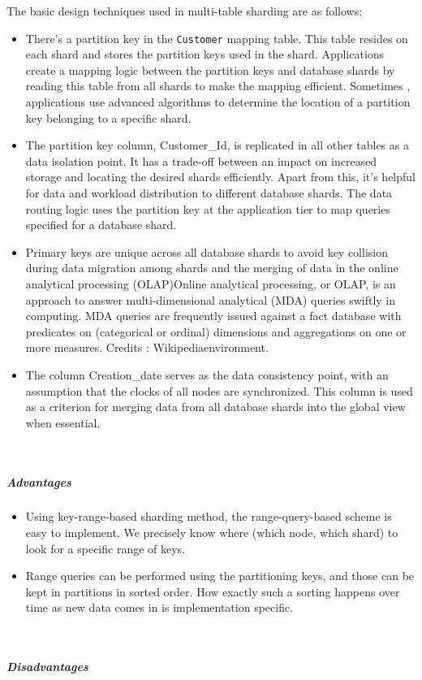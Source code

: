 The basic design techniques used in multi-table sharding are as follows:

\begin{itemize}
\item
\protect{}\label{jJ-Pak1W6uduCabx5hLln}
There's a partition key in the \texttt{Customer} mapping table. This table resides on each shard and stores the partition keys used in the shard. Applications create a mapping logic between the partition keys and database shards by reading this table from all shards to make the mapping efficient. Sometimes , applications use advanced algorithms to determine the location of a partition key belonging to a specific shard.
\item
\protect{}\label{obDuA_s-hvq5SBrbLdS8O}
The partition key column, Customer\_Id, is replicated in all other tables as a data isolation point. It has a trade-off between an impact on increased storage and locating the desired shards efficiently. Apart from this, it's helpful for data and workload distribution to different database shards. The data routing logic uses the partition key at the application tier to map queries specified for a database shard.
\item
\protect{}\label{OD3k92RczIxmwW-cp8LVo}
Primary keys are unique across all database shards to avoid key collision during data migration among shards and the merging of data in the online analytical processing (OLAP)Online analytical processing, or OLAP, is an approach to answer multi-dimensional analytical (MDA) queries swiftly in computing. MDA queries are frequently issued against a fact database with predicates on (categorical or ordinal) dimensions and aggregations on one or more measures. Credits : Wikipediaenvironment.
\item
\protect{}\label{TAIcwI0dNsmbYU-G7i2hU}
The column Creation\_date serves as the data consistency point, with an assumption that the clocks of all nodes are synchronized. This column is used as a criterion for merging data from all database shards into the global view when essential.
\end{itemize}
\\
\subparagraph{Advantages}\label{1T_Q3OcjrfmlV09b3Z14_}

\begin{itemize}
\item
\protect{}\label{1SyAouMHtdvNXvGJNaudC}
Using key-range-based sharding method, the range-query-based scheme is easy to implement. We precisely know where (which node, which shard) to look for a specific range of keys.
\item
\protect{}\label{AKR2jPS7BmrnALnggdpcC}
Range queries can be performed using the partitioning keys, and those can be kept in partitions in sorted order. How exactly such a sorting happens over time as new data comes in is implementation specific.
\end{itemize}
\\
\subparagraph{Disadvantages}\label{vthCLkRm_ynTaaP-LaAlU}

